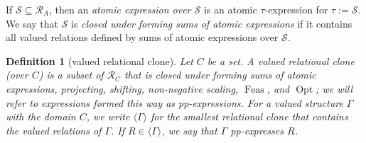 \documentclass[nonacm]{acmart}
\DeclareMathOperator{\Opt}{Opt}
\DeclareMathOperator{\Feas}{Feas}
\newtheorem{definition}[theorem]{Definition}
\begin{document}
If $\mathscr{S} \subseteq \mathscr{R}_A$, then an \emph{atomic expression over $\mathscr{S}$} is an atomic $\tau$-expression for $\tau :=\mathscr{S}$.
We say that $\mathscr{S}$ is \emph{closed under forming sums of atomic expressions} if it contains all valued relations defined by sums of atomic expressions over $\mathscr{S}$.


\begin{definition}[valued relational clone]\label{def:wrelclone}
Let $C$ be a set. A \emph{valued relational clone (over $C$)} is 
a subset of 
${\mathscr R}_C$ 
that 
is closed under forming sums of atomic expressions,
projecting, shifting, non-negative scaling, $\Feas$, and $\Opt$; we will refer to expressions formed this way as \emph{pp-expressions}.
For a valued structure $\Gamma$ with the domain $C$,  
we write 
$\langle \Gamma \rangle$ for the smallest relational clone that contains the valued relations of $\Gamma$. 
If $R \in \langle \Gamma \rangle$, we say that $\Gamma$ \emph{pp-expresses} $R$. 
\end{definition}





\end{document}
